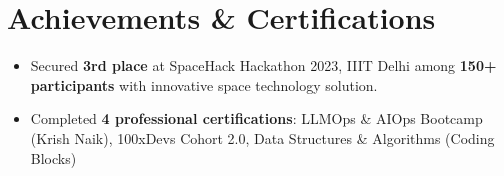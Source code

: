 \documentclass[letterpaper,11pt]{article}
\newcommand{\resumeItem}[1]{
  \item\small{
    {#1 \vspace{-3pt}}
  }
}
\newcommand{\resumeSubHeadingListStart}{\begin{itemize}[leftmargin=0.0in, label={}]}
\newcommand{\resumeSubHeadingListEnd}{\end{itemize}}
\newcommand{\resumeItemListStart}{\begin{itemize}}
\newcommand{\resumeItemListEnd}{\end{itemize}\vspace{-7pt}}
\begin{document}
\section{Achievements \& Certifications}
\vspace{2pt}
    \resumeSubHeadingListStart
        \resumeItemListStart
            \resumeItem{Secured \textbf{3rd place} at SpaceHack Hackathon 2023, IIIT Delhi among \textbf{150+ participants} with innovative space technology solution.}
            \resumeItem{Completed \textbf{4 professional certifications}: LLMOps \& AIOps Bootcamp (Krish Naik), 100xDevs Cohort 2.0, Data Structures \& Algorithms (Coding Blocks)}
        \resumeItemListEnd
    \resumeSubHeadingListEnd
\end{document}
